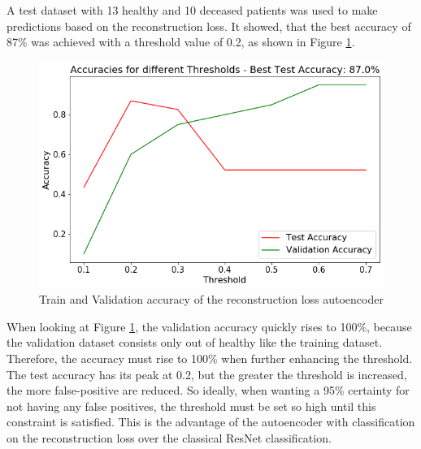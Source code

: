 \documentclass[journal]{IEEEtran}
\begin{document}
A test dataset with 13 healthy and 10 deceased patients was used to make predictions based on the reconstruction loss. It showed, that the best accuracy of 87\% was achieved with a threshold value of 0.2, as shown in Figure \ref{fig:ac_accuracy}.

\begin{figure}
\centering
\includegraphics[width=1\linewidth]{../imgs/ac_acc}
\caption{Train and Validation accuracy of the reconstruction loss autoencoder}
\label{fig:ac_accuracy}
\end{figure}

When looking at Figure \ref{fig:ac_accuracy}, the validation accuracy quickly rises to 100\%, because the validation dataset consists only out of healthy like the training dataset. Therefore, the accuracy must rise to 100\% when further enhancing the threshold. The test accuracy has its peak at 0.2, but the greater the threshold is increased, the more false-positive are reduced. So ideally, when wanting a 95\% certainty for not having any false positives, the threshold must be set so high until this constraint is satisfied. This is the advantage of the autoencoder with classification on the reconstruction loss over the classical ResNet classification. 
\end{document}
